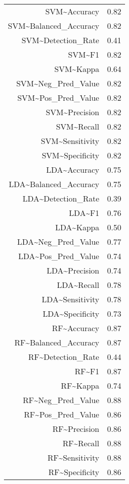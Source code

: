 \begin{table}[ht]
\begin{tabular}{rr}
  SVM\~{}Accuracy & 0.82 \\ 
  SVM\~{}Balanced\_Accuracy & 0.82 \\ 
  SVM\~{}Detection\_Rate & 0.41 \\ 
  SVM\~{}F1 & 0.82 \\ 
  SVM\~{}Kappa & 0.64 \\ 
  SVM\~{}Neg\_Pred\_Value & 0.82 \\ 
  SVM\~{}Pos\_Pred\_Value & 0.82 \\ 
  SVM\~{}Precision & 0.82 \\ 
  SVM\~{}Recall & 0.82 \\ 
  SVM\~{}Sensitivity & 0.82 \\ 
  SVM\~{}Specificity & 0.82 \\ 
  LDA\~{}Accuracy & 0.75 \\ 
  LDA\~{}Balanced\_Accuracy & 0.75 \\ 
  LDA\~{}Detection\_Rate & 0.39 \\ 
  LDA\~{}F1 & 0.76 \\ 
  LDA\~{}Kappa & 0.50 \\ 
  LDA\~{}Neg\_Pred\_Value & 0.77 \\ 
  LDA\~{}Pos\_Pred\_Value & 0.74 \\ 
  LDA\~{}Precision & 0.74 \\ 
  LDA\~{}Recall & 0.78 \\ 
  LDA\~{}Sensitivity & 0.78 \\ 
  LDA\~{}Specificity & 0.73 \\ 
  RF\~{}Accuracy & 0.87 \\ 
  RF\~{}Balanced\_Accuracy & 0.87 \\ 
  RF\~{}Detection\_Rate & 0.44 \\ 
  RF\~{}F1 & 0.87 \\ 
  RF\~{}Kappa & 0.74 \\ 
  RF\~{}Neg\_Pred\_Value & 0.88 \\ 
  RF\~{}Pos\_Pred\_Value & 0.86 \\ 
  RF\~{}Precision & 0.86 \\ 
  RF\~{}Recall & 0.88 \\ 
  RF\~{}Sensitivity & 0.88 \\ 
  RF\~{}Specificity & 0.86 \\ 
   \hline
\end{tabular}
\end{table}
